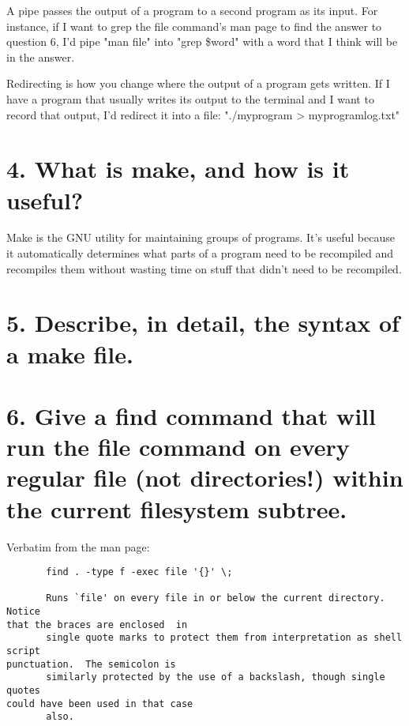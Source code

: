 \documentclass[10pt]{article}
\begin{document}
A pipe passes the output of a program to a second program as its input. For
instance, if I want to grep the file command's man page to find the answer to
question 6, I'd pipe "man file" into "grep \$word" with a word that I think
will be in the answer. 

Redirecting is how you change where the output of a program gets written. If I have
a program that usually writes its output to the terminal and  I want to record
that output, I'd redirect it into a file: "./myprogram > myprogramlog.txt"

\section{4. What is make, and how is it useful?}

Make is the GNU utility for maintaining groups of programs. It's useful
because it automatically determines what parts of a program need to be
recompiled and recompiles them without wasting time on stuff that didn't need
to be recompiled. 

\section{5. Describe, in detail, the syntax of a make file.}



\section{6. Give a find command that will run the file command on every regular file (not
directories!) within the current filesystem subtree.}

Verbatim from the man page:

\begin{verbatim}
       find . -type f -exec file '{}' \;

       Runs `file' on every file in or below the current directory.  Notice
that the braces are enclosed  in
       single quote marks to protect them from interpretation as shell script
punctuation.  The semicolon is
       similarly protected by the use of a backslash, though single quotes
could have been used in that case
       also.
\end{verbatim}
\end{document}
